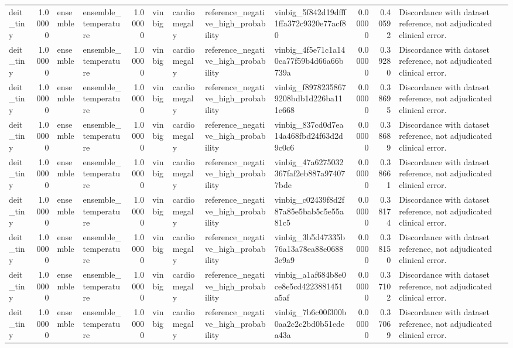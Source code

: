 \begin{tabular}{lrllrllllrrl}
deit\_tiny & 1.00000 & ensemble & ensemble\_temperature & 1.00000 & vinbig & cardiomegaly & reference\_negative\_high\_probability & vinbig\_5f842d19dfff1ffa372c9320e77acf80 & 0.00000 & 0.40592 & Discordance with dataset reference, not adjudicated clinical error. \\
deit\_tiny & 1.00000 & ensemble & ensemble\_temperature & 1.00000 & vinbig & cardiomegaly & reference\_negative\_high\_probability & vinbig\_4f5e71c1a140ca77f59b4d66a66b739a & 0.00000 & 0.39280 & Discordance with dataset reference, not adjudicated clinical error. \\
deit\_tiny & 1.00000 & ensemble & ensemble\_temperature & 1.00000 & vinbig & cardiomegaly & reference\_negative\_high\_probability & vinbig\_f89782358679208bdb1d226ba111e668 & 0.00000 & 0.38695 & Discordance with dataset reference, not adjudicated clinical error. \\
deit\_tiny & 1.00000 & ensemble & ensemble\_temperature & 1.00000 & vinbig & cardiomegaly & reference\_negative\_high\_probability & vinbig\_837cd0d7ea14a468fbd24f63d2d9c0c6 & 0.00000 & 0.38689 & Discordance with dataset reference, not adjudicated clinical error. \\
deit\_tiny & 1.00000 & ensemble & ensemble\_temperature & 1.00000 & vinbig & cardiomegaly & reference\_negative\_high\_probability & vinbig\_47a6275032367faf2eb887a974077bde & 0.00000 & 0.38661 & Discordance with dataset reference, not adjudicated clinical error. \\
deit\_tiny & 1.00000 & ensemble & ensemble\_temperature & 1.00000 & vinbig & cardiomegaly & reference\_negative\_high\_probability & vinbig\_c02439f8d2f87a85e5bab5c5e55a81c5 & 0.00000 & 0.38174 & Discordance with dataset reference, not adjudicated clinical error. \\
deit\_tiny & 1.00000 & ensemble & ensemble\_temperature & 1.00000 & vinbig & cardiomegaly & reference\_negative\_high\_probability & vinbig\_3b5d47335b76a13a78ea88e06883e9a9 & 0.00000 & 0.38150 & Discordance with dataset reference, not adjudicated clinical error. \\
deit\_tiny & 1.00000 & ensemble & ensemble\_temperature & 1.00000 & vinbig & cardiomegaly & reference\_negative\_high\_probability & vinbig\_a1af684b8e0ce8e5cd4223881451a5af & 0.00000 & 0.37102 & Discordance with dataset reference, not adjudicated clinical error. \\
deit\_tiny & 1.00000 & ensemble & ensemble\_temperature & 1.00000 & vinbig & cardiomegaly & reference\_negative\_high\_probability & vinbig\_7b6c00f300b0aa2c2c2bd0b51edea43a & 0.00000 & 0.37069 & Discordance with dataset reference, not adjudicated clinical error. \\

\end{tabular}
